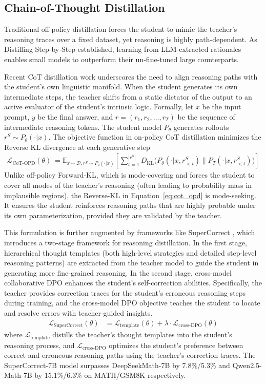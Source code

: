 \documentclass{article} %
\newcommand{\KL}{D_{\mathrm{KL}}}
\begin{document}
\subsection{Chain-of-Thought Distillation}
Traditional off-policy distillation forces the student to mimic the teacher's reasoning traces over a fixed dataset, yet reasoning is highly path-dependent. As Distilling Step-by-Step \citep{2305.02301} established, learning from LLM-extracted rationales enables small models to outperform their un-fine-tuned large counterparts. 

Recent CoT distillation work underscores the need to align reasoning paths with the student's own linguistic manifold. When the student generates its own intermediate steps, the teacher shifts from a static dictator of the output to an active evaluator of the student's intrinsic logic. Formally, let $x$ be the input prompt, $y$ be the final answer, and $r = (r_1, r_2, \dots, r_T)$ be the sequence of intermediate reasoning tokens. The student model $P_\theta$ generates rollouts $r^S \sim P_\theta(\cdot | x)$. The objective function in on-policy CoT distillation minimizes the Reverse KL divergence at each generative step
\begin{align}
\mathcal{L}_{\text{CoT-OPD}}(\theta) &= \mathbb{E}_{x \sim \mathcal{D}, r^S \sim P_\theta(\cdot|x)} \left[ \sum_{t=1}^{|r^S|} \KL \Big( P_\theta(\cdot | x, r^S_{<t}) \parallel P_T(\cdot | x, r^S_{<t}) \Big) \right] \label{eq:cot_opd}
\end{align}
Unlike off-policy Forward-KL, which is mode-covering and forces the student to cover all modes of the teacher's reasoning (often leading to probability mass in implausible regions), the Reverse-KL in Equation~\ref{eq:cot_opd} is mode-seeking. It ensures the student reinforces reasoning paths that are highly probable under its own parameterization, provided they are validated by the teacher.

This formulation is further augmented by frameworks like SuperCorrect \citep{2410.09008}, which introduces a two-stage framework for reasoning distillation. In the first stage, hierarchical thought templates (both high-level strategies and detailed step-level reasoning patterns) are extracted from the teacher model to guide the student in generating more fine-grained reasoning. In the second stage, cross-model collaborative DPO enhances the student's self-correction abilities. Specifically, the teacher provides correction traces for the student's erroneous reasoning steps during training, and the cross-model DPO objective teaches the student to locate and resolve errors with teacher-guided insights.
\begin{align}
\mathcal{L}_{\text{SuperCorrect}}(\theta) &= \mathcal{L}_{\text{template}}(\theta) + \lambda \cdot \mathcal{L}_{\text{cross-DPO}}(\theta)
\end{align}
where $\mathcal{L}_{\text{template}}$ distills the teacher's thought templates into the student's reasoning process, and $\mathcal{L}_{\text{cross-DPO}}$ optimizes the student's preference between correct and erroneous reasoning paths using the teacher's correction traces. The SuperCorrect-7B model surpasses DeepSeekMath-7B by 7.8\%/5.3\% and Qwen2.5-Math-7B by 15.1\%/6.3\% on MATH/GSM8K respectively.
\end{document}
